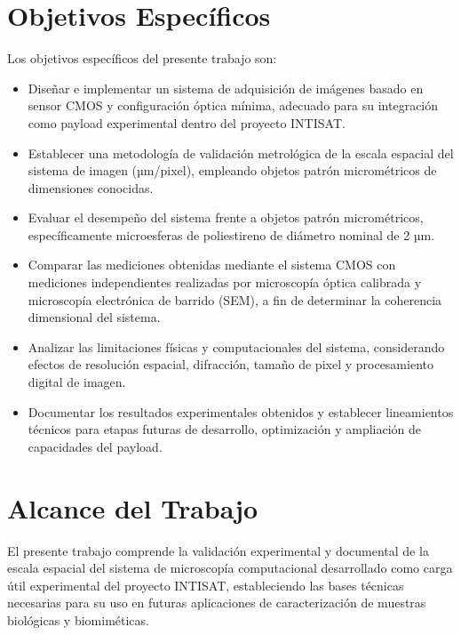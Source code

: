 \section{Objetivos Específicos}

Los objetivos específicos del presente trabajo son:

\begin{itemize}
    \item Diseñar e implementar un sistema de adquisición de imágenes basado en sensor CMOS y configuración óptica mínima, adecuado para su integración como payload experimental dentro del proyecto INTISAT.
    
    \item Establecer una metodología de validación metrológica de la escala espacial del sistema de imagen (µm/pixel), empleando objetos patrón micrométricos de dimensiones conocidas.
    
    \item Evaluar el desempeño del sistema frente a objetos patrón micrométricos, específicamente microesferas de poliestireno de diámetro nominal de 2 µm.
    
    \item Comparar las mediciones obtenidas mediante el sistema CMOS con mediciones independientes realizadas por microscopía óptica calibrada y microscopía electrónica de barrido (SEM), a fin de determinar la coherencia dimensional del sistema.
    
    \item Analizar las limitaciones físicas y computacionales del sistema, considerando efectos de resolución espacial, difracción, tamaño de pixel y procesamiento digital de imagen.
    
    \item Documentar los resultados experimentales obtenidos y establecer lineamientos técnicos para etapas futuras de desarrollo, optimización y ampliación de capacidades del payload.
\end{itemize}
\section{Alcance del Trabajo}

El presente trabajo comprende la validación experimental y documental de la escala espacial del sistema de microscopía computacional desarrollado como carga útil experimental del proyecto INTISAT, estableciendo las bases técnicas necesarias para su uso en futuras aplicaciones de caracterización de muestras biológicas y biomiméticas.

